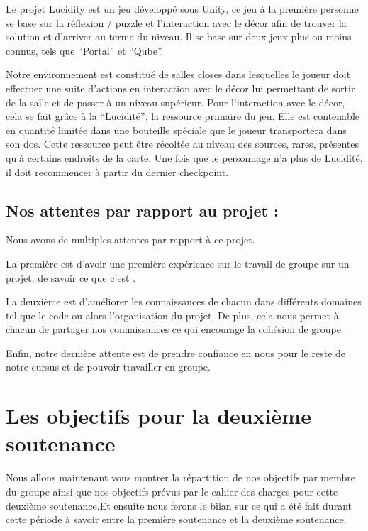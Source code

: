 \documentclass{article}
\begin{document}
\quad

Le projet Lucidity est un jeu développé sous Unity, ce jeu à la première personne se base sur la réflexion / puzzle et l’interaction avec le décor afin de trouver la solution et d’arriver au terme du niveau. Il se base sur deux jeux plus ou moins connus, tels que “Portal” et “Qube”.

Notre environnement est constitué de salles closes dans lesquelles le joueur doit effectuer une suite d’actions en interaction avec le décor lui permettant de sortir de la salle et de passer à un niveau supérieur. Pour l'interaction avec le décor, cela se fait grâce à la “Lucidité”, la ressource primaire du jeu. Elle est contenable en quantité limitée dans une bouteille spéciale que le joueur transportera dans son dos. Cette ressource peut être récoltée au niveau des sources, rares, présentes qu’à certains endroits de la carte. Une fois que le personnage n’a plus de Lucidité, il doit recommencer à partir du dernier checkpoint.


\newpage

	\subsection{Nos attentes par rapport au projet :}

\quad

\quad

Nous avons de multiples attentes par rapport à ce projet.

La première est d’avoir une première expérience sur le travail de groupe sur un projet, de savoir ce que c’est .

La deuxième est d’améliorer les connaissances de chacun dans différents domaines tel que le code ou alors l’organisation du projet. De plus, cela nous permet à chacun de partager nos connaissances ce qui encourage la cohésion de groupe 

Enfin, notre dernière attente est de prendre confiance en nous pour le reste de notre cursus et de pouvoir travailler en groupe.

\newpage


\section{Les objectifs pour la deuxième soutenance}

\quad

Nous allons maintenant vous montrer la répartition de nos objectifs par membre du groupe ainsi que  nos objectifs prévus par le cahier des charges pour cette deuxième soutenance.Et ensuite nous ferons le bilan sur ce qui a été fait durant cette période à savoir entre la première soutenance et la deuxième soutenance.
\end{document}
